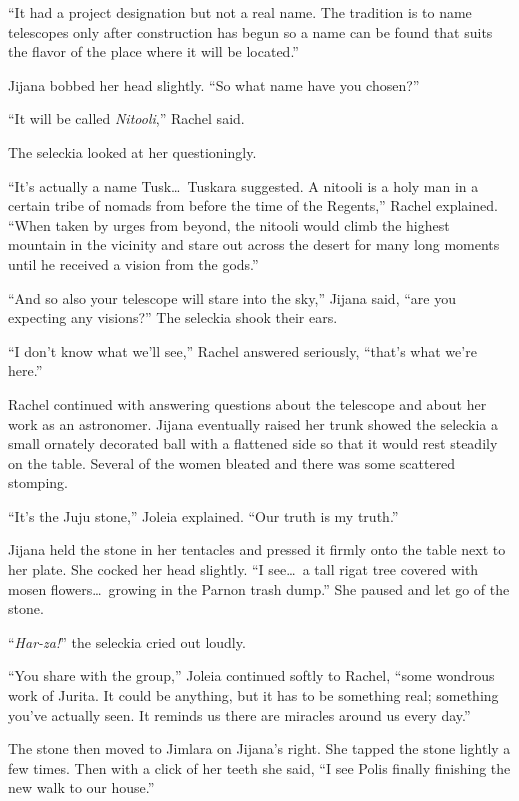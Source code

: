 ``It had a project designation but not a real name. The tradition is to name telescopes only
after construction has begun so a name can be found that suits the flavor of the place where it
will be located.''

Jijana bobbed her head slightly. ``So what name have you chosen?''

``It will be called \textit{Nitooli},'' Rachel said.

The seleckia looked at her questioningly.

``It's actually a name Tusk\ldots\ Tuskara suggested. A nitooli is a holy man in a certain tribe
of nomads from before the time of the Regents,'' Rachel explained. ``When taken by urges from
beyond, the nitooli would climb the highest mountain in the vicinity and stare out across the
desert for many long moments until he received a vision from the gods.''

``And so also your telescope will stare into the sky,'' Jijana said, ``are you expecting any
visions?'' The seleckia shook their ears.

``I don't know what we'll see,'' Rachel answered seriously, ``that's what we're here.''

Rachel continued with answering questions about the telescope and about her work as an
astronomer. Jijana eventually raised her trunk showed the seleckia a small ornately decorated
ball with a flattened side so that it would rest steadily on the table. Several of the women
bleated and there was some scattered stomping.

``It's the Juju stone,'' Joleia explained. ``Our truth is my truth.''

Jijana held the stone in her tentacles and pressed it firmly onto the table next to her plate.
She cocked her head slightly. ``I see\ldots\ a tall rigat tree covered with mosen flowers\ldots\
growing in the Parnon trash dump.'' She paused and let go of the stone.

``\textit{Har-za!}'' the seleckia cried out loudly.

``You share with the group,'' Joleia continued softly to Rachel, ``some wondrous work of Jurita.
It could be anything, but it has to be something real; something you've actually seen. It
reminds us there are miracles around us every day.''

The stone then moved to Jimlara on Jijana's right. She tapped the stone lightly a few times.
Then with a click of her teeth she said, ``I see Polis finally finishing the new walk to our
house.''


